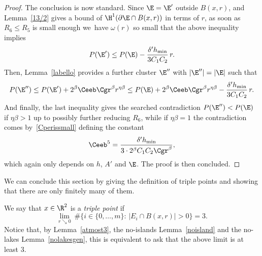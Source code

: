 \begin{proof}
The conclusion is now standard. Since $\E=\E'$ outside $B(x,r)$, and Lemma~\ref{13/2} gives a bound of $\H^1(\partial\E\cap B(x,r))$ in terms of $r$, as soon as $R_6\leq R_5$ is small enough we~have $\omega(r)$ so small that the above inequality implies
\[
P(\E')\leq P(\E) - \frac{\delta' h_{\min}}{3C_1C_2}\,r.
\]
Then, Lemma~\ref{labello} provides a further cluster $\E''$ with $|\E''|=|\E|$ such that
\[
P(\E'') \leq P(\E') + 2^\beta\Ceeb\Cgr^\beta r^{\eta\beta}
\leq P(\E) + 2^\beta\Ceeb\Cgr^\beta r^{\eta\beta}- \frac{\delta' h_{\min}}{3C_1C_2}\,r.
\]
And finally, the last inequality gives the searched contradiction $P(\E'')<P(\E)$ if $\eta\beta>1$ up to possibly further reducing $R_6$, while if $\eta\beta=1$ the contradiction comes by~\eqref{Cperissmall} defining the constant
\begin{equation}\label{ceeb5}
\Ceeb^5=\frac{\delta' h_{\min}}{3\cdot 2^\beta C_1 C_2\Cgr^\beta},
\end{equation}
which again only depends on $h$, $ A'$ and $\E$. The proof is then concluded.
\end{proof}

We can conclude this section by giving the definition of triple points and showing that there are only finitely many of them.

\begin{defn}\label{def3p}
We say that $x\in\R^2$ is a \emph{triple point} if
\[
\lim_{r\searrow 0}\ \# \bigl\{i\in\{0,\dots,m\}:\, \big| E_i\cap B(x,r)\big|>0\bigl\} = 3.
\]
Notice that, by Lemma~\ref{atmost3}, the no-islands Lemma~\ref{noisland} and the no-lakes Lemma~\ref{nolakesgen}, this is equivalent to ask that the above limit is at least $3$.
\end{defn}


